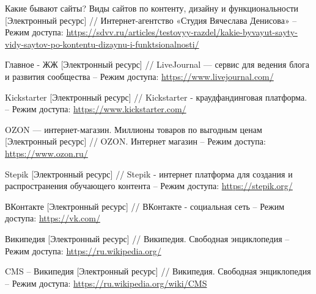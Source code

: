 \begingroup
\renewcommand{\section}[2]{\anonsection{Список использованных источников}}
\begin{thebibliography}{00}
		Какие бывают сайты? Виды сайтов по контенту, дизайну и функциональности
        [Электронный ресурс] //
		Интернет-агентство «Студия Вячеслава Денисова» 
        --
        Режим доступа:
        \href{https://sdvv.ru/articles/testovyy-razdel/kakie-byvayut-sayty-vidy-saytov-po-kontentu-dizaynu-i-funktsionalnosti/}{https://sdvv.ru/articles/testovyy-razdel/kakie-byvayut-sayty-vidy-saytov-po-kontentu-dizaynu-i-funktsionalnosti/}
    
        Главное - ЖЖ
        [Электронный ресурс] //
        LiveJournal — сервис для ведения блога и развития сообщества
        --
        Режим доступа:
        \href{https://www.livejournal.com/}{https://www.livejournal.com/}
        
        Kickstarter
        [Электронный ресурс] //
        Kickstarter - краудфандинговая платформа.
        --
        Режим доступа:
        \href{https://www.kickstarter.com/}{https://www.kickstarter.com/}

        OZON — интернет-магазин. Миллионы товаров по выгодным ценам
        [Электронный ресурс] //
        OZON. Интернет магазин
        --
        Режим доступа:
        \href{https://www.ozon.ru/}{https://www.ozon.ru/}

        Stepik
        [Электронный ресурс] //
        Stepik - интернет платформа для создания и распространения обучающего контента
        --
        Режим доступа:
        \href{https://stepik.org}{https://stepik.org/}

        ВКонтакте
        [Электронный ресурс] //
        ВКонтакте - социальная сеть
        --
        Режим доступа:
        \href{https://vk.com/}{https://vk.com/}

        Википедия
        [Электронный ресурс] //
        Википедия. Свободная энциклопедия
        --
        Режим доступа:
        \href{https://ru.wikipedia.org/}{https://ru.wikipedia.org/}

        CMS -- Википедия 
        [Электронный ресурс] //
        Википедия. Свободная энциклопедия
        --
        Режим доступа:
        \href{https://ru.wikipedia.org/wiki/CMS}{https://ru.wikipedia.org/wiki/CMS}


\end{thebibliography}
